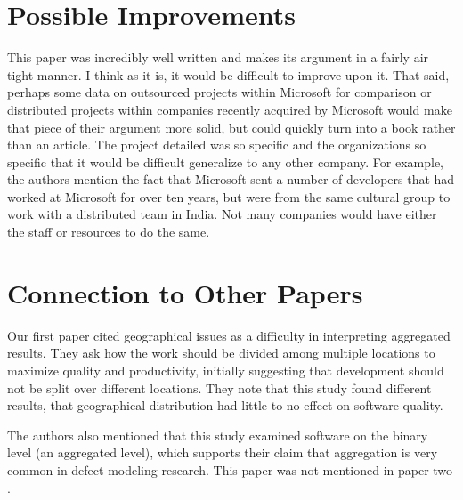 \documentclass[english]{article}
\begin{document}
\section*{Possible Improvements}
This paper was incredibly well written and makes its argument in a fairly air tight manner.  I think as it is, it would be difficult to improve upon it.  That said, perhaps some data on outsourced projects within Microsoft for comparison or distributed projects within companies recently acquired by Microsoft would make that piece of their argument more solid, but could quickly turn into a book rather than an article.  The project detailed was so specific and the organizations so specific that it would be difficult generalize to any other company.  For example, the authors mention the fact that Microsoft sent a number of developers that had worked at Microsoft for over ten years, but were from the same cultural group to work with a distributed team in India.   Not many companies would have either the staff or resources to do the same.

\section*{Connection to Other Papers}
Our first paper \cite{posnett11} cited geographical issues as a difficulty in interpreting aggregated results. They ask how the work should be divided among multiple locations to maximize quality and productivity, initially suggesting that development should not be split over different locations. They note that this study found different results, that geographical distribution had little to no effect on software quality. 

The authors also mentioned that this study examined software on the binary level (an aggregated level), which supports their claim that aggregation is very common in defect modeling research.  This paper was not mentioned in paper two \cite{arisholm10}.




\end{document}

